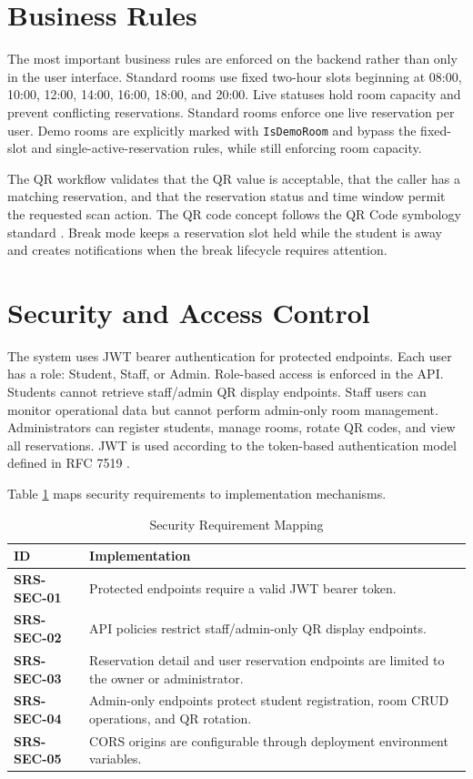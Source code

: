 \documentclass[conference]{IEEEtran}
\newcommand{\srs}[1]{\textbf{#1}}
\begin{document}
\section{Business Rules}
The most important business rules are enforced on the backend rather than only
in the user interface. Standard rooms use fixed two-hour slots beginning at
08:00, 10:00, 12:00, 14:00, 16:00, 18:00, and 20:00. Live statuses hold room
capacity and prevent conflicting reservations. Standard rooms enforce one live
reservation per user. Demo rooms are explicitly marked with \texttt{IsDemoRoom}
and bypass the fixed-slot and single-active-reservation rules, while still
enforcing room capacity.

The QR workflow validates that the QR value is acceptable, that the caller has
a matching reservation, and that the reservation status and time window permit
the requested scan action. The QR code concept follows the QR Code symbology
standard \cite{iso_qr}. Break mode keeps a reservation slot held while the
student is away and creates notifications when the break lifecycle requires
attention.

\section{Security and Access Control}
The system uses JWT bearer authentication for protected endpoints. Each user
has a role: Student, Staff, or Admin. Role-based access is enforced in the API.
Students cannot retrieve staff/admin QR display endpoints. Staff users can
monitor operational data but cannot perform admin-only room management.
Administrators can register students, manage rooms, rotate QR codes, and view
all reservations. JWT is used according to the token-based authentication model
defined in RFC 7519 \cite{rfc7519}.

Table \ref{tab:security} maps security requirements to implementation
mechanisms.

\begin{table}[htbp]
\caption{Security Requirement Mapping}
\label{tab:security}
\centering
\begin{tabularx}{\linewidth}{@{}lX@{}}
\toprule
\textbf{ID} & \textbf{Implementation} \\
\midrule
\srs{SRS-SEC-01} & Protected endpoints require a valid JWT bearer token. \\
\srs{SRS-SEC-02} & API policies restrict staff/admin-only QR display
endpoints. \\
\srs{SRS-SEC-03} & Reservation detail and user reservation endpoints are
limited to the owner or administrator. \\
\srs{SRS-SEC-04} & Admin-only endpoints protect student registration, room
CRUD operations, and QR rotation. \\
\srs{SRS-SEC-05} & CORS origins are configurable through deployment
environment variables. \\
\bottomrule
\end{tabularx}
\end{table}
\end{document}

